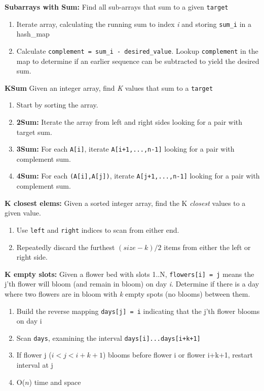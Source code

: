 \documentclass[12pt]{article}
\newcommand{\ON}{O($n$) }
\begin{document}
\vspace{5mm}
\noindent
\textbf{Subarrays with Sum:}
Find all sub-arrays that sum to a given \texttt{target}
\begin{enumerate}
\item Iterate array, calculating the running sum to index \emph{i} and storing \texttt{sum\_i} in a hash\_map
\item Calculate \texttt{complement = sum\_i - desired\_value}. Lookup \texttt{complement} in the map to determine if an earlier sequence can be subtracted to yield the desired sum.
\end{enumerate}


\vspace{5mm}
\noindent
\textbf{KSum}
Given an integer array, find \emph{K} values that sum to a \texttt{target}
\begin{enumerate}
\item Start by sorting the array.
\item \textbf{2Sum:} Iterate the array from left and right sides looking for a pair with target sum.
\item \textbf{3Sum:} For each \texttt{A[i]}, iterate \texttt{A[i+1,...,n-1]} looking for a pair with complement sum.
\item \textbf{4Sum:} For each \texttt{(A[i],A[j])}, iterate \texttt{A[j+1,...,n-1]} looking for a pair with complement sum.
\end{enumerate}


\vspace{5mm}
\noindent
\textbf{K closest elems:}
Given a sorted integer array, find the K \emph{closest} values to a given value.
\begin{enumerate}
\item Use \texttt{left} and \texttt{right} indices to scan from either end.
\item Repeatedly discard the furthest $(size - k)/2$ items from either the left or right side.
\end{enumerate}


\vspace{5mm}
\noindent
\textbf{K empty slots:}
Given a flower bed with slots 1..N, \texttt{flowers[i] = j} means the j'th flower will bloom (and remain in bloom) on day \emph{i}. Determine if there is a day where two flowers are in bloom with 
\emph{k} empty spots (no blooms) between them.
\begin{enumerate}
\item Build the reverse mapping \texttt{days[j] = i} indicating that the j'th flower blooms on day i
\item Scan \texttt{days}, examining the interval \texttt{days[i]...days[i+k+1]}
\item If flower j ($i < j < i + k + 1$) blooms before flower i or flower i+k+1, restart interval at j
\item \ON time and space
\end{enumerate}
\end{document}
